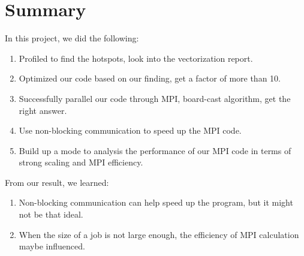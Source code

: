 \section{Summary}
\label{sec:summary}

In this project, we did the following:

\begin{enumerate}
\item Profiled to find the hotspots, look into the vectorization report.
\item Optimized our code based on our finding, get a factor of more than 10.
\item Successfully parallel our code through MPI, board-cast algorithm, get the right answer.
\item Use non-blocking communication to speed up the MPI code.
\item Build up a mode to analysis the performance of our MPI code in terms of strong scaling and MPI
	  efficiency.
\end{enumerate}

From our result, we learned:

\begin{enumerate}
\item Non-blocking communication can help speed up the program, but it might not be that ideal.
\item When the size of a job is not large enough, the efficiency of MPI calculation maybe influenced.
\end{enumerate}
